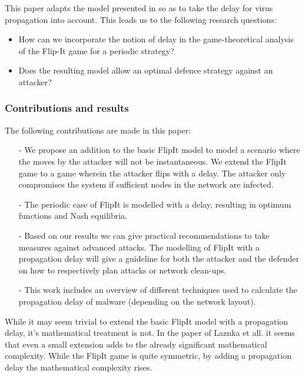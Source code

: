 This paper adapts the model presented in \cite{FlipIt} so as to take the delay for virus propagation into account.
This leads us to the following research questions:
\begin{itemize}
\item How can we incorporate the notion of delay in the game-theoretical analysis of the Flip-It game for a periodic strategy?
\item Does the resulting model allow an optimal defence strategy against an attacker? 
\end{itemize}

\subsubsection{Contributions and results}
The following contributions are made in this paper:
\begin{itemize}
\item[-] We propose an addition to the basic FlipIt model to model a scenario where the moves by the attacker will not be instantaneous. We extend the FlipIt game to a game wherein the attacker flips with a delay. The attacker only compromises the system if sufficient nodes in the network are infected. 
\item[-] The periodic case of FlipIt is modelled with a delay, resulting in optimum functions and Nash equilibria. 
\item[-] Based on our results we can give practical recommendations to take measures against advanced attacks.  The modelling of FlipIt with a propagation delay will give a guideline for both the attacker and the defender on how to respectively plan attacks or network clean-ups.
\item[-] This work includes an overview of different techniques used to calculate the propagation delay of malware (depending on the network layout). 
\end{itemize}


While it may seem trivial to extend the basic FlipIt model with a propagation delay, it's mathematical treatment is not. In the paper of Laznka et all. \citep{FlipThem} it seems that even a small extension adds to the already significant mathematical complexity. While the FlipIt game is quite symmetric, by adding a propagation delay the mathematical complexity rises.

